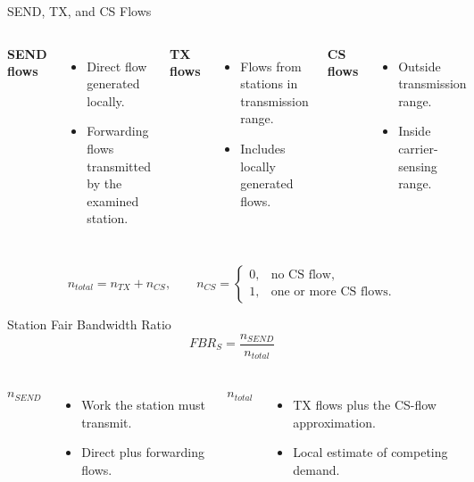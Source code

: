 \begin{frame}{SEND, TX, and CS Flows}
\begin{columns}[T,onlytextwidth]
\textbf{SEND flows}
\begin{itemize}
\item Direct flow generated locally.
\item Forwarding flows transmitted by the examined station.
\end{itemize}
\textbf{TX flows}
\begin{itemize}
\item Flows from stations in transmission range.
\item Includes locally generated flows.
\end{itemize}
\textbf{CS flows}
\begin{itemize}
\item Outside transmission range.
\item Inside carrier-sensing range.
\end{itemize}
\end{columns}
\vspace{0.45cm}
\[
n_{total}=n_{TX}+n_{CS},\qquad
n_{CS}=\begin{cases}0,&\text{no CS flow},\\1,&\text{one or more CS flows.}\end{cases}
\]
\vspace{-0.08cm}
\end{frame}

\begin{frame}{Station Fair Bandwidth Ratio}
\[
\boxed{FBR_S=\frac{n_{SEND}}{n_{total}}}
\]
\begin{columns}[T,onlytextwidth]
\textbf{$n_{SEND}$}
\begin{itemize}
\item Work the station must transmit.
\item Direct plus forwarding flows.
\end{itemize}
\textbf{$n_{total}$}
\begin{itemize}
\item TX flows plus the CS-flow approximation.
\item Local estimate of competing demand.
\end{itemize}
\end{columns}
\vspace{0.25cm}
\end{frame}

